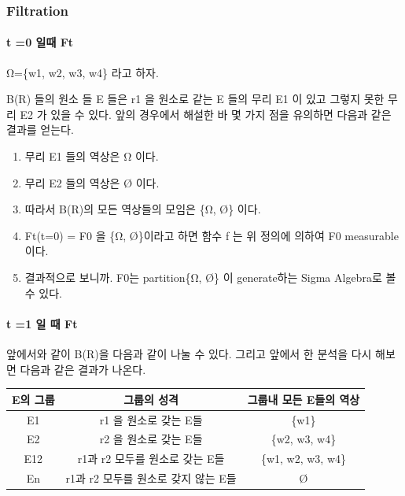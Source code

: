 \documentclass[
]{book}
\providecommand{\tightlist}{%
  \setlength{\itemsep}{0pt}\setlength{\parskip}{0pt}}
\begin{document}
{{{\hypertarget{filtration}{%
\subsubsection{Filtration}\label{filtration}}

\hypertarget{t-0-uxc77cuxb54c-ft}{%
\paragraph{t =0 일때 Ft}\label{t-0-uxc77cuxb54c-ft}}

Ω=\{w1, w2, w3, w4\} 라고 하자.

B(R) 들의 원소 들 E 들은 r1 을 원소로 같는 E 들의 무리 E1 이 있고 그렇지 못한 무리 E2 가 있을 수 있다.
앞의 경우에서 해설한 바 몇 가지 점을 유의하면 다음과 같은 결과를 얻는다.

\begin{enumerate}
\def\labelenumi{\arabic{enumi}.}
\tightlist
\item
  무리 E1 들의 역상은 Ω 이다.
\item
  무리 E2 들의 역상은 Ø 이다.
\item
  따라서 B(R)의 모든 역상들의 모임은 \{Ω, Ø\} 이다.
\item
  Ft(t=0) = F0 을 \{Ω, Ø\}이라고 하면 함수 f 는 위 정의에 의하여 F0 measurable이다.
\item
  결과적으로 보니까. F0는 partition\{Ω, Ø\} 이 generate하는 Sigma Algebra로 볼 수 있다.
\end{enumerate}

\hypertarget{t-1-uxc77c-uxb54c-ft}{%
\paragraph{t =1 일 때 Ft}\label{t-1-uxc77c-uxb54c-ft}}

앞에서와 같이 B(R)을 다음과 같이 나눌 수 있다. 그리고 앞에서 한 분석을 다시 해보면 다음과 같은 결과가 나온다.

\begin{longtable}[]{@{}ccc@{}}
\toprule
E의 그룹 & 그룹의 성격 & 그룹내 모든 E들의 역상 \\
\midrule
\endhead
E1 & r1 을 원소로 갖는 E들 & \{w1\} \\
E2 & r2 을 원소로 갖는 E들 & \{w2, w3, w4\} \\
E12 & r1과 r2 모두를 원소로 갖는 E들 & \{w1, w2, w3, w4\} \\
En & r1과 r2 모두를 원소로 갖지 않는 E들 & Ø \\
\bottomrule
\end{longtable}

}}}
\end{document}
